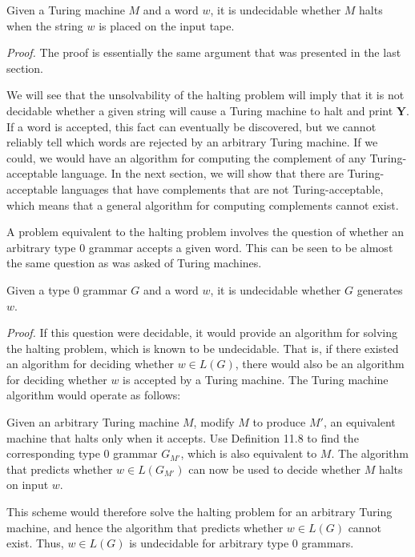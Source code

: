 \begin{thm}\label{thm-12.10}
Given a Turing machine $M$ and a word $w$, it is undecidable whether $M$ halts
when the string $w$ is placed on the input tape.

\emph{Proof.} The proof is essentially the same argument that was presented in
the last section.
\end{thm}

We will see that the unsolvability of the halting problem will imply that it
is not decidable whether a given string will cause a Turing machine to halt and
print $\pmb{Y}$. If a word is accepted, this fact can eventually be discovered,
but we cannot reliably tell which words are rejected by an arbitrary Turing
machine. If we could, we would have an algorithm for computing the complement of
any Turing-acceptable language. In the next section, we will show that there are
Turing-acceptable languages that have complements that are not Turing-acceptable,
which means that a general algorithm for computing complements cannot exist.

A problem equivalent to the halting problem involves the question of whether
an arbitrary type 0 grammar accepts a given word. This can be seen to be almost
the same question as was asked of Turing machines.

\begin{thm}\label{thm-12.11}
Given a type 0 grammar $G$ and a word $w$, it is undecidable whether $G$
generates $w$.

\emph{Proof.} If this question were decidable, it would provide an algorithm for
solving the halting problem, which is known to be undecidable. That is, if there
existed an algorithm for deciding whether $w\in L(G)$, there would also be an
algorithm for deciding whether $w$ is accepted by a Turing machine. The Turing
machine algorithm would operate as follows:

Given an arbitrary Turing machine $M$, modify $M$ to produce $M'$, an equivalent
machine that halts only when it accepts. Use Definition 11.8 to find the
corresponding type 0 grammar $G_{M'}$, which is also equivalent to $M$. The
algorithm that predicts whether $w\in L(G_{M'})$ can now be used to decide
whether $M$ halts on input $w$.

This scheme would therefore solve the halting problem for an arbitrary Turing
machine, and hence the algorithm that predicts whether $w\in L(G)$ cannot exist.
Thus, $w\in L(G)$ is undecidable for arbitrary type 0 grammars.
\end{thm}

